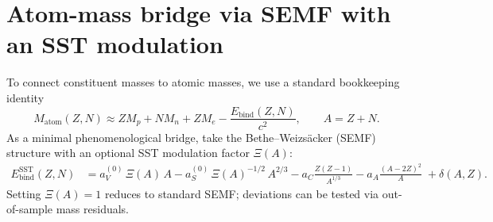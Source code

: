 \section{Atom-mass bridge via SEMF with an SST modulation}
To connect constituent masses to atomic masses, we use a standard bookkeeping identity
\begin{equation}
M_{\text{atom}}(Z,N)\approx ZM_p+NM_n+ZM_e-\frac{E_{\text{bind}}(Z,N)}{c^2},
\qquad A=Z+N.
\end{equation}
As a minimal phenomenological bridge, take the Bethe--Weizs\"acker (SEMF) structure with an optional SST modulation factor $\Xi(A)$:
\begin{align}
E_{\text{bind}}^{\text{SST}}(Z,N)
&=
a_V^{(0)}\,\Xi(A)\,A
-a_S^{(0)}\,\Xi(A)^{-1/2}\,A^{2/3}
-a_C\frac{Z(Z-1)}{A^{1/3}}
-a_A\frac{(A-2Z)^2}{A}
\;+\delta(A,Z).
\end{align}
Setting $\Xi(A)=1$ reduces to standard SEMF; deviations can be tested via out-of-sample mass residuals.

